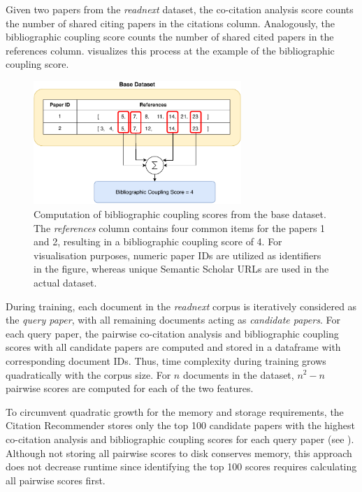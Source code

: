 Given two papers from the \emph{readnext} dataset, the co-citation analysis score counts the number of shared citing papers in the citations column. Analogously, the bibliographic coupling score counts the number of shared cited papers in the references column.  visualizes this process at the example of the bibliographic coupling score.

\begin{figure}[htb!]
    \centering
    \includegraphics[width=0.7\textwidth]{diagrams/bibliographic_coupling_from_references.pdf}
    \caption[Bibliographic Coupling Score]{Computation of bibliographic coupling scores from the base dataset. The \emph{references} column contains four common items for the papers 1 and 2, resulting in a bibliographic coupling score of 4. For visualisation purposes, numeric paper IDs are utilized as identifiers in the figure, whereas unique Semantic Scholar URLs are used in the actual dataset.}
    \label{fig:bibliographic_coupling_from_references}
\end{figure}

During training, each document in the \emph{readnext} corpus is iteratively considered as the \emph{query paper}, with all remaining documents acting as \emph{candidate papers}. For each query paper, the pairwise co-citation analysis and bibliographic coupling scores with all candidate papers are computed and stored in a dataframe with corresponding document IDs.
Thus, time complexity during training grows quadratically with the corpus size.
For $n$ documents in the dataset, $n^2 - n$ pairwise scores are computed for each of the two features.

To circumvent quadratic growth for the memory and storage requirements, the Citation Recommender stores only the top 100 candidate papers with the highest co-citation analysis and bibliographic coupling scores for each query paper (see ).
Although not storing all pairwise scores to disk conserves memory, this approach does not decrease runtime since identifying the top 100 scores requires calculating all pairwise scores first.


